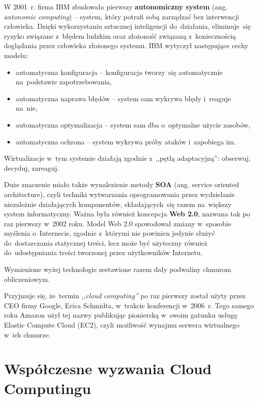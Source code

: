 \documentclass[12pt,a4paper,twoside,titlepage,openright]{book}
\begin{document}
W 2001~r. firma IBM zbudowała pierwszy \textbf{autonomiczny system} (ang. \textit{antonomic computing}) -- system, który potrafi sobą zarządzać bez interwencji człowieka. Dzięki wykorzystaniu sztucznej inteligencji do~działania, eliminuje~się ryzyko związane z~błędem ludzkim oraz złożoność związaną z~koniecznością doglądania przez człowieka złożonego systemu. IBM wytyczył następujące cechy modelu:
\begin{itemize}
\item automatyczna konfiguracja -- konfiguracja tworzy~się automatycznie na~podstawie zapotrzebowania,
\item automatyczna naprawa błędów -- system sam wykrywa błędy i~reaguje na~nie,
\item automatyczna optymalizacja -- system sam dba o~optymalne użycie zasobów,
\item automatyczna ochrona -- system wykrywa próby ataków i~zapobiega im.
\end{itemize}
Wirtualizacje w~tym systemie działają zgodnie z~,,pętlą adaptacyjną'': obserwuj, decyduj, zareaguj.\cite{ccSpringer}


Duże znaczenie miało także wynalezienie metody \textbf{SOA} (ang. service oriented architecture), czyli techniki wytwarzania oprogramowania przez wydzielanie niezależnie działających komponentów, składających~się razem na~większy system informatyczny. Ważna była również koncepcja \textbf{Web 2.0}, nazwana tak po raz pierwszy w~2002 roku. Model Web 2.0 spowodował zmiany w~sposobie myślenia o~Internecie, zgodnie z~którymi nie powinien jedynie służyć do~dostarczania statycznej treści, lecz może być użyteczny również do~udostępniania treści tworzonej przez użytkowników Internetu.

Wymienione wyżej technologie zestawione razem dały podwaliny chmurom obliczeniowym.

Przyjmuje się, że~termin \textit{,,cloud computing''} po raz pierwszy został użyty przez CEO firmy Google, Erica Schmidta, w~trakcie konferencji w~2006~r. Tego samego roku Amazon użył tej nazwy publikując pionierską w~swoim gatunku usługę Elastic Compute Cloud (EC2), czyli możliwość wynajmu serwera wirtualnego w~ich chmurze.

\section{Współczesne wyzwania Cloud Computingu}
\end{document}
